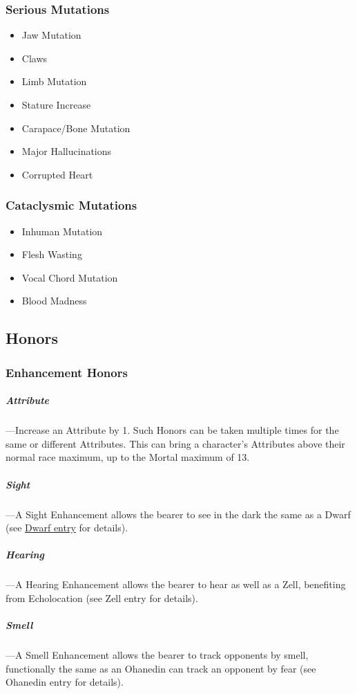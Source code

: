 \documentclass[oneside,11pt,english]{book}
\begin{document}
\subsubsection{Serious Mutations}\label{sec:Mutation-Serious}
\begin{itemize}
	[noitemsep]
	\item Jaw Mutation 
	\item Claws 
	\item Limb Mutation 
	\item Stature Increase 
	\item Carapace/Bone Mutation 
	\item Major Hallucinations 
	\item Corrupted Heart 
\end{itemize}

\subsubsection{Cataclysmic Mutations}\label{sec:Mutation-Cataclysmic}
\begin{itemize}
	[noitemsep]
	\item Inhuman Mutation
	\item Flesh Wasting
	\item Vocal Chord Mutation
	\item Blood Madness
\end{itemize}
\subsection{Honors}
\subsubsection{Enhancement Honors}
\subparagraph{Attribute}\label{honor:Attribute}
---\quad Increase an Attribute by 1. Such Honors can be taken multiple times for the same or 
different Attributes. This can bring a character’s Attributes above their normal race maximum, up 
to the Mortal maximum of 13. 

\subparagraph{Sight}\label{honor:Sight}
---\quad A Sight Enhancement allows the bearer to see in the dark the same as a Dwarf (see \hyperref[par:Dwarf - See in Shadow]{Dwarf entry} for details).

\subparagraph{Hearing}\label{honor:Hearing}
---\quad A Hearing Enhancement allows the bearer to hear as well as a Zell, benefiting from 
Echolocation (see Zell entry for details). 

\subparagraph{Smell}\label{honor:Smell}
---\quad A Smell Enhancement allows the bearer to track opponents by smell, functionally the 
same as an Ohanedin can track an opponent by fear (see Ohanedin entry for details). 
\end{document}
